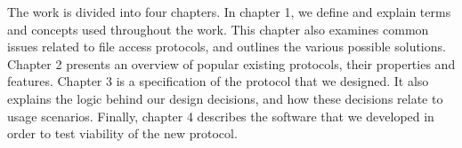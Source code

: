 The work is divided into four chapters. In chapter 1, we define and explain terms and concepts used throughout
the work. This chapter also examines common issues related to file access protocols, and outlines the various
possible solutions. Chapter 2 presents an overview of popular existing protocols, their properties and
features. Chapter 3 is a specification of the protocol that we designed. It also explains the logic behind our
design decisions, and how these decisions relate to usage scenarios. Finally, chapter 4 describes the software
that we developed in order to test viability of the new protocol.

